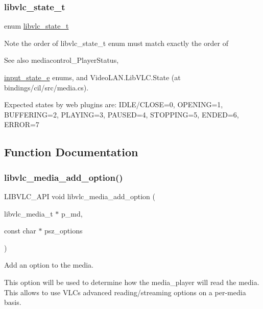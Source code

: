 \subsubsection{\texorpdfstring{libvlc\+\_\+state\+\_\+t}{libvlc\_state\_t}}
{\footnotesize\ttfamily enum \hyperlink{group__libvlc__media_gac88ad60037ea05e1f23675a2ebe31efc}{libvlc\+\_\+state\+\_\+t}}

Note the order of libvlc\+\_\+state\+\_\+t enum must match exactly the order of \begin{DoxySeeAlso}{See also}
mediacontrol\+\_\+\+Player\+Status, 

\hyperlink{vlc__input_8h_a158f30c7fe25669dd399e71e5924ae3f}{input\+\_\+state\+\_\+e} enums, and Video\+L\+A\+N.\+Lib\+V\+L\+C.\+State (at bindings/cil/src/media.\+cs).
\end{DoxySeeAlso}
Expected states by web plugins are\+: I\+D\+L\+E/\+C\+L\+O\+SE=0, O\+P\+E\+N\+I\+NG=1, B\+U\+F\+F\+E\+R\+I\+NG=2, P\+L\+A\+Y\+I\+NG=3, P\+A\+U\+S\+ED=4, S\+T\+O\+P\+P\+I\+NG=5, E\+N\+D\+ED=6, E\+R\+R\+OR=7 

\subsection{Function Documentation}
\mbox{\label{group__libvlc__media_ga39511e64baa7c1fdbf89eddc88bf9e15}} 
\subsubsection{\texorpdfstring{libvlc\+\_\+media\+\_\+add\+\_\+option()}{libvlc\_media\_add\_option()}}
{\footnotesize\ttfamily L\+I\+B\+V\+L\+C\+\_\+\+A\+PI void libvlc\+\_\+media\+\_\+add\+\_\+option (\begin{DoxyParamCaption}\item[{libvlc\+\_\+media\+\_\+t $\ast$}]{p\+\_\+md,  }\item[{const char $\ast$}]{psz\+\_\+options }\end{DoxyParamCaption})}

Add an option to the media.

This option will be used to determine how the media\+\_\+player will read the media. This allows to use V\+LC\textquotesingle{}s advanced reading/streaming options on a per-\/media basis.

